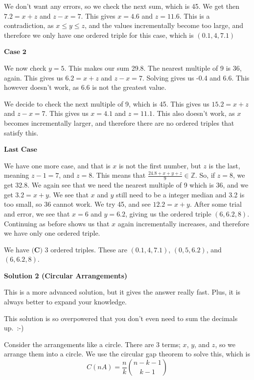 \begin{enumerate}
 We don't want any errors, so we check the next sum, which is 45. We get then \( 7.2=x+z \) and \( z-x=7 \). This gives \( x=4.6 \) and \( z=11.6 \). This is a contradiction, as \( x \le y \le z \), and the values incrementally become too large, and therefore we only have one ordered triple for this case, which is \( (0.1,4,7.1) \)

 $\textbf{Case 2}$

 We now check \( y=5 \). This makes our sum 29.8. The nearest multiple of 9 is 36, again. This gives us \( 6.2 = x+z \) and \( z-x=7 \). Solving gives us -0.4 and 6.6. This however doesn't work, as 6.6 is not the greatest value.

 We decide to check the next multiple of 9, which is 45. This gives us \( 15.2 = x+z \) and \( z-x=7 \). This gives us \( x=4.1 \) and \( z=11.1 \). This also doesn't work, as \( x \) becomes incrementally larger, and therefore there are no ordered triples that satisfy this.

 $\textbf{Last Case}$

 We have one more case, and that is \(x\) is not the first number, but \( z \) is the last, meaning \( z-1=7 \), and \( z=8 \). This means that \( \frac{24.8+x+y+z}{9} \in \mathbb{Z} \). So, if \( z=8 \), we get 32.8. We again see that we need the nearest multiple of 9 which is 36, and we get \( 3.2 = x+y \). We see that \( x \) and \( y \) still need to be a integer median and 3.2 is too small, so 36 cannot work. We try 45, and see \( 12.2 = x+y \). After some trial and error, we see that \( x=6 \) and \( y=6.2 \), giving us the ordered triple \( (6,6.2,8) \). Continuing as before shows us that \( x \) again incrementally increases, and therefore we have only one ordered triple.

 We have $\boxed{\textbf{(C) }3}$ ordered triples. These are \( (0.1,4,7.1) \), \( (0,5,6.2) \), and \( (6,6.2,8) \).

 



\textbf{Solution 2 (Circular Arrangements)}

This is a more advanced solution, but it gives the answer really fast. Plus, it is always better to expand your knowledge.

 This solution is so overpowered that you don't even need to sum the decimals up. :-)

 Consider the arrangements like a circle. There are 3 terms; \( x \), \( y \), and \( z \), so we arrange them into a circle. We use the circular gap theorem to solve this, which is 
 \[C(nA) = \frac{n}{k} \binom{n-k-1}{k-1}\]


\end{enumerate}
